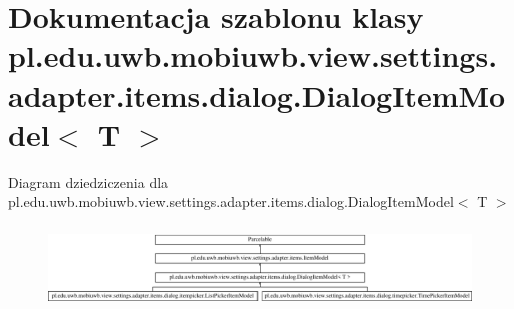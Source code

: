 \hypertarget{classpl_1_1edu_1_1uwb_1_1mobiuwb_1_1view_1_1settings_1_1adapter_1_1items_1_1dialog_1_1_dialog_item_model}{}\section{Dokumentacja szablonu klasy pl.\+edu.\+uwb.\+mobiuwb.\+view.\+settings.\+adapter.\+items.\+dialog.\+Dialog\+Item\+Model$<$ T $>$}
\label{classpl_1_1edu_1_1uwb_1_1mobiuwb_1_1view_1_1settings_1_1adapter_1_1items_1_1dialog_1_1_dialog_item_model}
Diagram dziedziczenia dla pl.\+edu.\+uwb.\+mobiuwb.\+view.\+settings.\+adapter.\+items.\+dialog.\+Dialog\+Item\+Model$<$ T $>$\begin{figure}[H]
\begin{center}
\leavevmode
\includegraphics[height=2.187500cm]{classpl_1_1edu_1_1uwb_1_1mobiuwb_1_1view_1_1settings_1_1adapter_1_1items_1_1dialog_1_1_dialog_item_model}
\end{center}
\end{figure}
